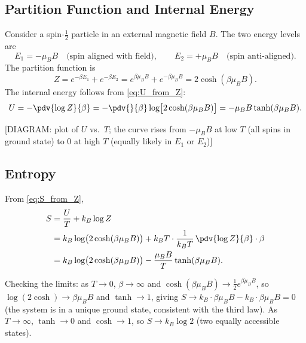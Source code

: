 \subsection{Partition Function and Internal Energy}

Consider a spin-$\tfrac{1}{2}$ particle in an external magnetic field $B$.  The two energy
levels are
\begin{equation}
    E_1 = -\mu_B B \quad\text{(spin aligned with field)}, \qquad
    E_2 = +\mu_B B \quad\text{(spin anti-aligned)}.
\end{equation}
The partition function is
\begin{equation}
    Z = e^{-\beta E_1} + e^{-\beta E_2}
      = e^{\beta\mu_B B} + e^{-\beta\mu_B B}
      = 2\cosh(\beta\mu_B B).
\end{equation}
The internal energy follows from \eqref{eq:U_from_Z}:
\begin{equation}
    U = -\pdv{\log Z}{\beta} = -\pdv{}{\beta}\log\bigl[2\cosh(\beta\mu_B B)\bigr]
      = -\mu_B B\tanh(\beta\mu_B B).
\end{equation}

\begin{center}[DIAGRAM: plot of $U$ vs.\ $T$; the curve rises from $-\mu_B B$ at low $T$ (all spins in ground state) to $0$ at high $T$ (equally likely in $E_1$ or $E_2$)]\end{center}

\subsection{Entropy}

From \eqref{eq:S_from_Z},
\begin{align}
    S &= \frac{U}{T} + k_B\log Z \notag\\
      &= k_B\log\bigl(2\cosh(\beta\mu_B B)\bigr) + k_BT\cdot\frac{1}{k_BT}\,\pdv{\log Z}{\beta}\cdot\beta
      \notag\\
      &= k_B\log\bigl(2\cosh(\beta\mu_B B)\bigr) - \frac{\mu_B B}{T}\tanh(\beta\mu_B B).
\end{align}

Checking the limits: as $T\to 0$, $\beta\to\infty$ and $\cosh(\beta\mu_B B)\to\tfrac{1}{2}e^{\beta\mu_B B}$,
so $\log(2\cosh)\to \beta\mu_B B$ and $\tanh\to 1$, giving $S\to k_B\cdot\beta\mu_B B - k_B\cdot\beta\mu_B B = 0$
(the system is in a unique ground state, consistent with the third law).  As $T\to\infty$,
$\tanh\to 0$ and $\cosh\to 1$, so $S\to k_B\log 2$ (two equally accessible states).

